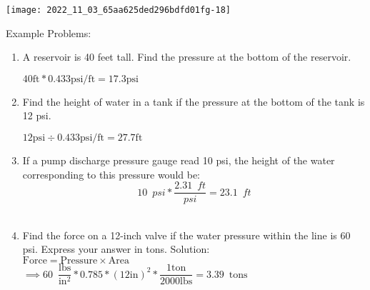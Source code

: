\begin{center}
\texttt{[image: 2022\_11\_03\_65aa625ded296bdfd01fg-18]}
\end{center}

\vspace{0.2cm}

Example Problems:\\
\vspace{0.2cm}

\begin{enumerate}[1.]
\item A reservoir is 40 feet tall. Find the pressure at the bottom of the reservoir.

$40 \mathrm{ft} * 0.433 \mathrm{psi} / \mathrm{ft}=17.3 \mathrm{psi}$

\vspace{0.4cm}

\item Find the height of water in a tank if the pressure at the bottom of the tank is 12 psi.

$12 \mathrm{psi} \div 0.433 \mathrm{psi} / \mathrm{ft}=27.7 \mathrm{ft}$

\vspace{0.4cm}

\item If a pump discharge pressure gauge read 10 psi, the height of the water corresponding to this pressure would be:
$$10 \enspace psi * \dfrac{2.31 \enspace ft}{psi}=23.1 \enspace ft$$\\
\vspace{0.4cm}

 \item Find the force on a 12-inch valve if the water pressure within the line is 60 psi. Express your answer in tons.
\vspace{0.2cm}
Solution:\\
\vspace{0.2cm}
$\textrm{Force}= \textrm{Pressure} \times \textrm{Area}$\\
\vspace{0.3cm}
$\implies 60 \enspace \dfrac{\mathrm{lbs}}{\mathrm{in^2}}*0.785 *(12 \mathrm{in})^2*\dfrac{1 \mathrm{ton}}{2000 \mathrm{lbs}} =\boxed{3.39 \enspace\mathrm{tons}}$
\vspace{0.3cm}
\end{enumerate}

